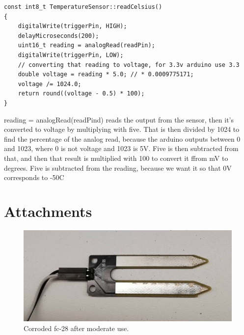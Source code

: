 \documentclass{article}
\begin{document}
\pagebreak
\begin{verbatim}
const int8_t TemperatureSensor::readCelsius()
{
    digitalWrite(triggerPin, HIGH);
    delayMicroseconds(200);
    uint16_t reading = analogRead(readPin);
    digitalWrite(triggerPin, LOW);
    // converting that reading to voltage, for 3.3v arduino use 3.3
    double voltage = reading * 5.0; // * 0.0009775171;
    voltage /= 1024.0;
    return round((voltage - 0.5) * 100);
}
\end{verbatim}

reading = analogRead(readPind) reads the output from the sensor, then it's converted to voltage by multiplying with five. That is then divided by 1024 to find the percentage of the analog read, because the arduino outputs between 0 and 1023, where 0 is not voltage and 1023 is 5V. Five is then subtracted from that, and then that result is multiplied with 100 to convert it ffrom mV to degrees. Five is subtracted from the reading, because we want it so that 0V corresponds to -50\textdegree{}C
\pagebreak

\section{Attachments}
\begin{figure}
  \centering
      \includegraphics{fc-28-corrosion}
  \caption{Corroded fc-28 after moderate use.}
\end{figure}


\pagebreak
{}

\nocite{*}
% 
\end{document}
